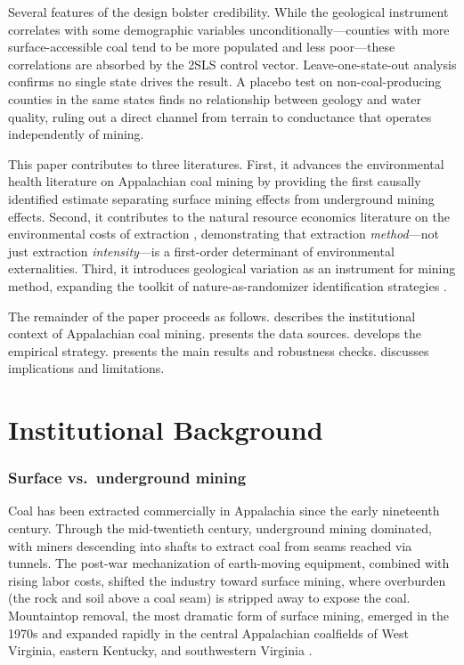 \documentclass[12pt]{article}
\begin{document}
Several features of the design bolster credibility. While the geological instrument correlates with some demographic variables unconditionally---counties with more surface-accessible coal tend to be more populated and less poor---these correlations are absorbed by the 2SLS control vector. Leave-one-state-out analysis confirms no single state drives the result. A placebo test on non-coal-producing counties in the same states finds no relationship between geology and water quality, ruling out a direct channel from terrain to conductance that operates independently of mining.

This paper contributes to three literatures. First, it advances the environmental health literature on Appalachian coal mining \citep{hendryx2009mortality, hendryx2008relations, ahern2011impact, zullig2014mortality} by providing the first causally identified estimate separating surface mining effects from underground mining effects. Second, it contributes to the natural resource economics literature on the environmental costs of extraction \citep{currie2014environmental, holladay2016shale, hill2018fracturing}, demonstrating that extraction \textit{method}---not just extraction \textit{intensity}---is a first-order determinant of environmental externalities. Third, it introduces geological variation as an instrument for mining method, expanding the toolkit of nature-as-randomizer identification strategies \citep{nunn2012ruggedness, bleakley2012portage, michalopoulos2014national}.

The remainder of the paper proceeds as follows.  describes the institutional context of Appalachian coal mining.  presents the data sources.  develops the empirical strategy.  presents the main results and robustness checks.  discusses implications and limitations.


\section{Institutional Background}
\label{sec:background}

\subsubsection*{Surface vs.\ underground mining} Coal has been extracted commercially in Appalachia since the early nineteenth century. Through the mid-twentieth century, underground mining dominated, with miners descending into shafts to extract coal from seams reached via tunnels. The post-war mechanization of earth-moving equipment, combined with rising labor costs, shifted the industry toward surface mining, where overburden (the rock and soil above a coal seam) is stripped away to expose the coal. Mountaintop removal, the most dramatic form of surface mining, emerged in the 1970s and expanded rapidly in the central Appalachian coalfields of West Virginia, eastern Kentucky, and southwestern Virginia \citep{palmer2010mountaintop}.
\end{document}
